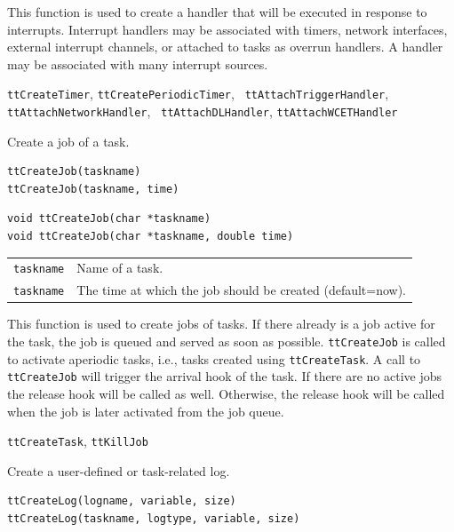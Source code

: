 \documentclass[final,twoside]{rapport}
\begin{document}
\descr This function is used to create a handler that will be executed
in response to interrupts. Interrupt handlers may be associated with
timers, network interfaces, external interrupt channels, or
attached to tasks as overrun handlers. A handler may be associated
with many interrupt sources.

\seealso 
{\tt ttCreateTimer}, {\tt ttCreatePeriodicTimer}, {\tt
  ttAttachTriggerHandler}, \\ {\tt ttAttachNetworkHandler}, {\tt
  ttAttachDLHandler}, {\tt ttAttachWCETHandler} 



\purpose
Create a job of a task.

\Msyntax
\begin{verbatim}
ttCreateJob(taskname)
ttCreateJob(taskname, time)
\end{verbatim}

\Csyntax
\begin{verbatim}
void ttCreateJob(char *taskname)
void ttCreateJob(char *taskname, double time)
\end{verbatim}

\args
\begin{tabularx}{\hsize}{l>{\raggedright\arraybackslash}X}
  {\tt taskname} & Name of a task. \\
  {\tt taskname} & The time at which the job should be created (default=now).\\
\end{tabularx}

\descr This function is used to create jobs of tasks. If
there already is a job active for the task, the job is queued and
served as soon as possible. {\tt ttCreateJob} is called to activate
aperiodic tasks, i.e., tasks created using {\tt ttCreateTask}.
A call to {\tt ttCreateJob} will trigger the arrival hook of the task.
If there are no active jobs the release hook will be called as well.
Otherwise, the release hook will be called when the job is later
activated from the job queue.

\seealso
{\tt ttCreateTask}, {\tt ttKillJob}



\purpose
Create a user-defined or task-related log.

\Msyntax
\begin{verbatim}
ttCreateLog(logname, variable, size)
ttCreateLog(taskname, logtype, variable, size)
\end{verbatim}
\end{document}
